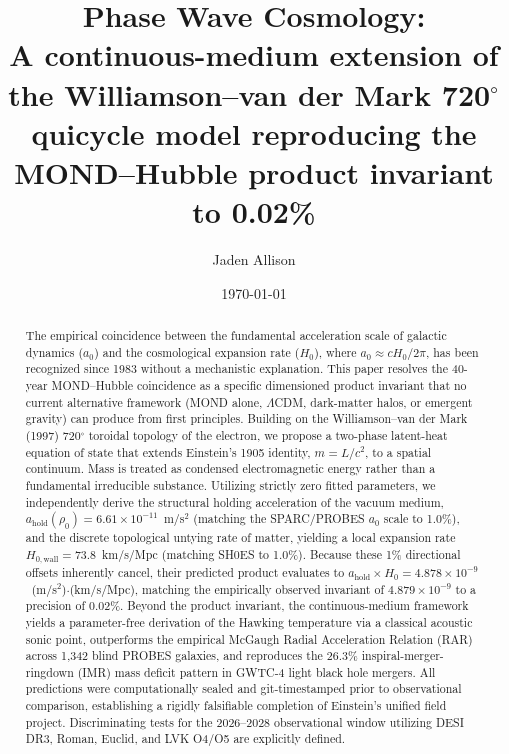 \documentclass[aps,prd,twocolumn,superscriptaddress,amsmath,amssymb,nofootinbib,floatfix]{revtex4-2}
\newcommand{\amax}{a_{\text{hold}}}
\newcommand{\rhonaught}{\rho_{0}}
\newcommand{\Hwall}{H_{0,\text{wall}}}
\begin{document}
\title{Phase Wave Cosmology: \\
A continuous-medium extension of the Williamson--van der Mark 720$^{\circ}$ quicycle model reproducing the MOND--Hubble product invariant to 0.02\%}

\author{Jaden Allison}

\date{\today}

\begin{abstract}
The empirical coincidence between the fundamental acceleration scale of galactic dynamics ($a_0$) and the cosmological expansion rate ($H_0$), where $a_0 \approx c H_0 / 2\pi$, has been recognized since 1983 without a mechanistic explanation. This paper resolves the 40-year MOND--Hubble coincidence as a specific dimensioned product invariant that no current alternative framework (MOND alone, $\Lambda$CDM, dark-matter halos, or emergent gravity) can produce from first principles. Building on the Williamson--van der Mark (1997) 720$^{\circ}$ toroidal topology of the electron, we propose a two-phase latent-heat equation of state that extends Einstein's 1905 identity, $m = L/c^2$, to a spatial continuum. Mass is treated as condensed electromagnetic energy rather than a fundamental irreducible substance. Utilizing strictly zero fitted parameters, we independently derive the structural holding acceleration of the vacuum medium, $\amax(\rhonaught) = 6.61 \times 10^{-11}$~m/s$^2$ (matching the SPARC/PROBES $a_0$ scale to 1.0\%), and the discrete topological untying rate of matter, yielding a local expansion rate $\Hwall = 73.8$~km/s/Mpc (matching SH0ES to 1.0\%). Because these 1\% directional offsets inherently cancel, their predicted product evaluates to $\amax \times H_0 = 4.878 \times 10^{-9}$~(m/s$^2$)$\cdot$(km/s/Mpc), matching the empirically observed invariant of $4.879 \times 10^{-9}$ to a precision of 0.02\%. Beyond the product invariant, the continuous-medium framework yields a parameter-free derivation of the Hawking temperature via a classical acoustic sonic point, outperforms the empirical McGaugh Radial Acceleration Relation (RAR) across 1,342 blind PROBES galaxies, and reproduces the 26.3\% inspiral-merger-ringdown (IMR) mass deficit pattern in GWTC-4 light black hole mergers. All predictions were computationally sealed and git-timestamped prior to observational comparison, establishing a rigidly falsifiable completion of Einstein's unified field project. Discriminating tests for the 2026--2028 observational window utilizing DESI DR3, Roman, Euclid, and LVK O4/O5 are explicitly defined.
\end{abstract}
\end{document}
